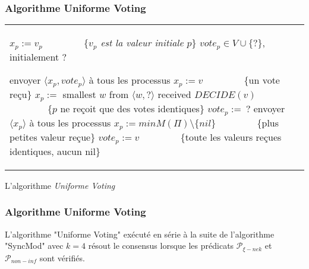 \documentclass{beamer}
\begin{document}
\begin{frame}
\frametitle{Algorithme Uniforme Voting}
\begin{algorithm}[H]
\tiny{
\begin{distribalgo}[1]
\begin{tabular}{ll}
\begin{minipage}{33em}
\INDENT{\textbf{Initialisation:}}
	\STATE $x_p := v_p$ ~~~~~~~~\{\emph{\tiny $v_p$ est la valeur initiale $p$}\}
	\STATE $vote_p \in V\cup\{ ? \}$, initialement $?$

\ENDINDENT
\INDENT{\textbf{Round $2r$:}}
	\INDENT{$S_p:$}
		\STATE envoyer $\langle x_p , vote_p \rangle$ à tous les processus
	\ENDINDENT
	\INDENT{$T_p:$}
		\IF{$M(q) = \langle v, v \rangle$}
			\STATE $x_p:= v$ ~~~~~~~~\{\tiny un vote reçu\}
		\ELSE
			\STATE $x_p :=$ smallest  $w$ from  $\langle w , ? \rangle$ received
		\ENDIF
		\IF{$M(\Pi) = \{ \langle v, v \rangle \}$}
			\STATE $DECIDE(v)$ ~~~~~~~~\{\tiny $p$ ne reçoit que des votes identiques\}
		\ENDIF
		\STATE $vote_p :=\ ?$
	\ENDINDENT
\ENDINDENT
\INDENT{\textbf{Round $2r+1$:}}
	\INDENT{$S_p:$}
		\STATE envoyer $\langle x_p \rangle$ à tous les processus
	\ENDINDENT
	\INDENT{$T_p:$}
		\STATE $ x_p := min M(\Pi) \setminus \{nil\}$ ~~~~~~~~\{\tiny plus petites valeur reçue\}
		\IF{$M(\Pi) = \{v\}$}
			\STATE $vote_p := v$ ~~~~~~~~\{\tiny toute les valeurs reçues identiques, aucun nil\}
		\ENDIF
	\ENDINDENT
\ENDINDENT
\end{minipage}
\end{tabular}
\caption{L'algorithme {\em Uniforme Voting}}
\label{unifvotfig}
\end{distribalgo}
}
\end{algorithm}
\end{frame}

\begin{frame}
\frametitle{Algorithme Uniforme Voting}
\begin{theorem}
	L'algorithme "Uniforme Voting" exécuté en série à la suite de l'algorithme "SyncMod" avec $k = 4$
	résout le consensus lorsque les prédicats $\mathcal{P}_{\xi-nek}$ et $\mathcal{P}_{non-inf}$ sont vérifiés.
\end{theorem}
\end{frame}
\end{document}

